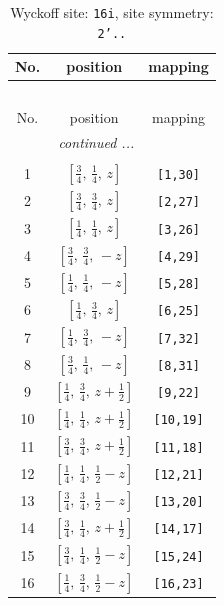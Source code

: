 \documentclass[fleqn,8pt]{jsarticle}
\begin{document}
\begin{longtable}{ccc}
\caption{Wyckoff site: {\tt 16i}, site symmetry: {\tt 2'..}}
 \\
 \hline \hline
No. & position & mapping \\ \hline \endfirsthead

\multicolumn{2}{l}{\tablename\ \thetable{}} \\
 \hline \hline
No. & position & mapping \\ \hline \endhead

 \hline \hline
\multicolumn{2}{r}{\footnotesize\it continued ...} \\ \endfoot

 \hline \hline
\multicolumn{2}{r}{} \\ \endlastfoot

1 & $\left[ \frac{3}{4},\, \frac{1}{4},\, z \right]$ & {\tt [1,30]} \\ \hline
2 & $\left[ \frac{3}{4},\, \frac{3}{4},\, z \right]$ & {\tt [2,27]} \\ \hline
3 & $\left[ \frac{1}{4},\, \frac{1}{4},\, z \right]$ & {\tt [3,26]} \\ \hline
4 & $\left[ \frac{3}{4},\, \frac{3}{4},\, - z \right]$ & {\tt [4,29]} \\ \hline
5 & $\left[ \frac{1}{4},\, \frac{1}{4},\, - z \right]$ & {\tt [5,28]} \\ \hline
6 & $\left[ \frac{1}{4},\, \frac{3}{4},\, z \right]$ & {\tt [6,25]} \\ \hline
7 & $\left[ \frac{1}{4},\, \frac{3}{4},\, - z \right]$ & {\tt [7,32]} \\ \hline
8 & $\left[ \frac{3}{4},\, \frac{1}{4},\, - z \right]$ & {\tt [8,31]} \\ \hline
9 & $\left[ \frac{1}{4},\, \frac{3}{4},\, z + \frac{1}{2} \right]$ & {\tt [9,22]} \\ \hline
10 & $\left[ \frac{1}{4},\, \frac{1}{4},\, z + \frac{1}{2} \right]$ & {\tt [10,19]} \\ \hline
11 & $\left[ \frac{3}{4},\, \frac{3}{4},\, z + \frac{1}{2} \right]$ & {\tt [11,18]} \\ \hline
12 & $\left[ \frac{1}{4},\, \frac{1}{4},\, \frac{1}{2} - z \right]$ & {\tt [12,21]} \\ \hline
13 & $\left[ \frac{3}{4},\, \frac{3}{4},\, \frac{1}{2} - z \right]$ & {\tt [13,20]} \\ \hline
14 & $\left[ \frac{3}{4},\, \frac{1}{4},\, z + \frac{1}{2} \right]$ & {\tt [14,17]} \\ \hline
15 & $\left[ \frac{3}{4},\, \frac{1}{4},\, \frac{1}{2} - z \right]$ & {\tt [15,24]} \\ \hline
16 & $\left[ \frac{1}{4},\, \frac{3}{4},\, \frac{1}{2} - z \right]$ & {\tt [16,23]} \\
\end{longtable}
\end{document}
